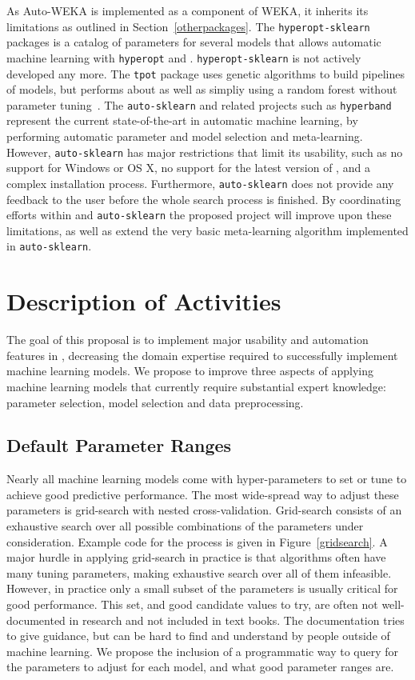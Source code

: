 As Auto-WEKA is implemented as a component of WEKA, it inherits its limitations
as outlined in Section~\ref{otherpackages}. 
The \texttt{hyperopt-sklearn} packages is a catalog of parameters for several \sklearn{}
models that allows automatic machine learning with \texttt{hyperopt} and
\sklearn{}. \texttt{hyperopt-sklearn} is not actively developed any more.
The \texttt{tpot} package uses genetic algorithms to build pipelines of
\sklearn{} models, but performs about as well as simpliy using a random forest
without parameter tuning~\autocite{OlsonGECCO2016}.
The \texttt{auto-sklearn} and related projects such as
\texttt{hyperband}~\autocite{li2016hyperband} represent the current
state-of-the-art in automatic machine learning, by performing automatic
parameter and model selection and meta-learning.
However, \texttt{auto-sklearn} has major restrictions that limit its usability,
such as no support for Windows or OS X, no support for the latest version of \sklearn{},
and a complex installation process. Furthermore, \texttt{auto-sklearn} does not provide
any feedback to the user before the whole search process is finished.
By coordinating efforts within \sklearn{} and \texttt{auto-sklearn} the proposed project
will improve upon these limitations, as well as extend the very basic meta-learning
algorithm implemented in \texttt{auto-sklearn}.



\section{Description of Activities}
The goal of this proposal is to implement major usability and automation
features in \sklearn{}, decreasing the domain expertise required to
successfully implement machine learning models.  We propose to improve three
aspects of applying machine learning models that currently require substantial
expert knowledge: parameter selection, model selection and data preprocessing.

\subsection{Default Parameter Ranges}
Nearly all machine learning models come with hyper-parameters to set or tune
to achieve good predictive performance. The most wide-spread way to adjust
these parameters is grid-search with nested cross-validation.
Grid-search consists of an exhaustive search over all possible combinations
of the parameters under consideration. Example code for the process is given
in Figure~\ref{gridsearch}.
A major hurdle in applying grid-search in practice is that algorithms
often have many tuning parameters, making exhaustive search
over all of them infeasible. However, in practice only a small subset
of the parameters is usually critical for good performance. This set,
and good candidate values to try, are often not well-documented in research and
not included in text books.
The \sklearn{} documentation tries to give guidance, but can be hard
to find and understand by people outside of machine learning.
We propose the inclusion of a programmatic way to query for the parameters
to adjust for each model, and what good parameter ranges are.

